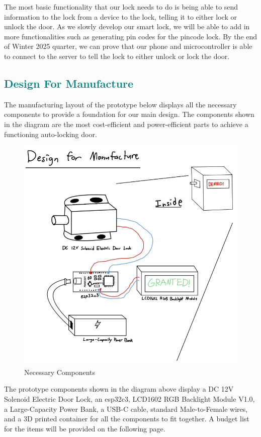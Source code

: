 The most basic functionality that our lock needs to do is being able to send information to the lock from a device to the lock, telling it to either lock or unlock the door. As we slowly develop our smart lock, we will be able to add in more functionalities such as generating pin codes for the pincode lock. By the end of Winter 2025 quarter, we can prove that our phone and microcontroller is able to connect to the server to tell the lock to either unlock or lock the door.

\newpage
\textcolor{teal}{\subsection{Design For Manufacture} \label{DesignForManufacture}}

The manufacturing layout of the prototype below displays all the necessary components to provide a foundation for our main design. The components shown in the diagram are the most cost-efficient and power-efficient parts to achieve a functioning auto-locking door.

\begin{figure}[!ht]
    \centering
    \includegraphics[width=0.85\linewidth]{./img/DFM.png}
    \caption{Necessary Components}
    \label{fig:enter-label}
\end{figure}

The prototype components shown in the diagram above display a DC 12V Solenoid Electric Door Lock, an esp32c3, LCD1602 RGB Backlight Module V1.0, a Large-Capacity Power Bank, a USB-C cable, standard Male-to-Female wires, and a 3D printed container for all the components to fit together. A budget list for the items will be provided on the following page.

\newpage
